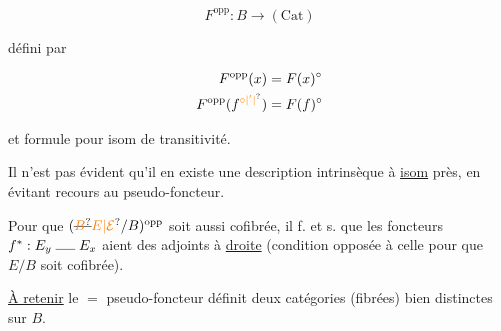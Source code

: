 
\[ F^{\mathrm{opp}}:B\longrightarrow(\mathrm{Cat}) \]

défini par

\[
\begin{aligned}
F^{\mathrm{opp}}(x)&=F(x)^\circ\\
F^{\mathrm{opp}}(f^{\unsure{\circ|'|{}}})&=F(f)^\circ
\end{aligned}
\]


et formule  pour isom de transitivité.

Il n'est pas évident qu'il en existe une description intrinsèque à \uline{isom} près, en évitant  recours au pseudo-foncteur.

Pour que $(\deleted{\unsure{B}}{\unsure{E|\mathcal E}}/B)^{\mathrm{opp}}$ soit aussi cofibrée, il f. et s. que les foncteurs $f^*:E_y\mathrel{\rule{1.4em}{.35pt}}E_x$ aient des adjoints à \uline{droite} (condition opposée à celle pour que $E/B$ soit cofibrée).

\uline{À retenir} le $=$ pseudo-foncteur définit deux catégories (fibrées) bien distinctes sur $B$.

